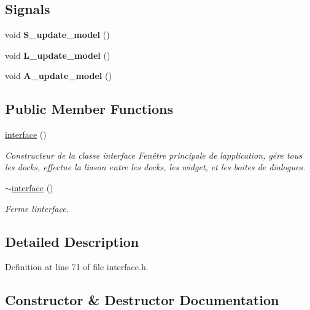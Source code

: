 \subsection*{Signals}
\begin{DoxyCompactItemize}
\item 
\mbox{\label{classinterface_a300de30478e2e2616b61abad24bf319a}} 
void {\bfseries S\+\_\+update\+\_\+model} ()
\item 
\mbox{\label{classinterface_a7d829b8bd407c58d27b0849f4891f155}} 
void {\bfseries L\+\_\+update\+\_\+model} ()
\item 
\mbox{\label{classinterface_ad09217bb805eb4405dfc8d0b7cc6e547}} 
void {\bfseries A\+\_\+update\+\_\+model} ()
\end{DoxyCompactItemize}
\subsection*{Public Member Functions}
\begin{DoxyCompactItemize}
\item 
\hyperlink{classinterface_a13e0ee4b9df1714d747d62ec46220c55}{interface} ()
\begin{DoxyCompactList}\small\item\em Constructeur de la classe interface Fenêtre principale de l\textquotesingle{}application, gére tous les docks, effectue la liason entre les docks, les widget, et les boites de dialogues. \end{DoxyCompactList}\item 
\hyperlink{classinterface_a8511f28c5bc5d3c24a24e9aaef4db502}{$\sim$interface} ()
\begin{DoxyCompactList}\small\item\em Ferme l\textquotesingle{}interface. \end{DoxyCompactList}\end{DoxyCompactItemize}


\subsection{Detailed Description}


Definition at line 71 of file interface.\+h.



\subsection{Constructor \& Destructor Documentation}
\mbox{\label{classinterface_a13e0ee4b9df1714d747d62ec46220c55}} 
